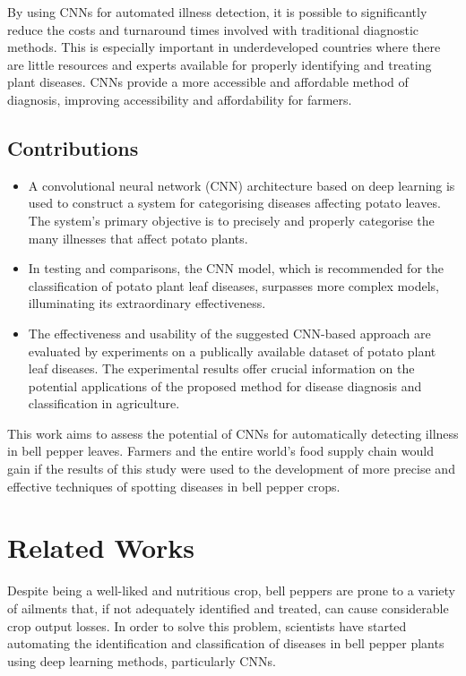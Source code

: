 \documentclass[conference]{IEEEtran}
\begin{document}
By using CNNs for automated illness detection, it is possible to significantly reduce the costs and turnaround times involved with traditional diagnostic methods. This is especially important in underdeveloped countries where there are little resources and experts available for properly identifying and treating plant diseases. CNNs provide a more accessible and affordable method of diagnosis, improving accessibility and affordability for farmers.

\subsection{Contributions}
\begin{itemize}
    \item A convolutional neural network (CNN) architecture based on deep learning is used to construct a system for categorising diseases affecting potato leaves. The system's primary objective is to precisely and properly categorise the many illnesses that affect potato plants.
    \item In testing and comparisons, the CNN model, which is recommended for the classification of potato plant leaf diseases, surpasses more complex models, illuminating its extraordinary effectiveness.
    \item The effectiveness and usability of the suggested CNN-based approach are evaluated by experiments on a publically available dataset of potato plant leaf diseases. The experimental results offer crucial information on the potential applications of the proposed method for disease diagnosis and classification in agriculture.\\
\end{itemize}
 
This work aims to assess the potential of CNNs for automatically detecting illness in bell pepper leaves. Farmers and the entire world's food supply chain would gain if the results of this study were used to the development of more precise and effective techniques of spotting diseases in bell pepper crops.


\section{Related Works}
Despite being a well-liked and nutritious crop, bell peppers are prone to a variety of ailments that, if not adequately identified and treated, can cause considerable crop output losses. In order to solve this problem, scientists have started automating the identification and classification of diseases in bell pepper plants using deep learning methods, particularly CNNs.\\
\end{document}
